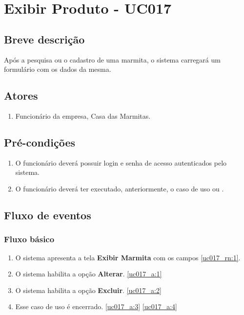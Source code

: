 \chapter{Exibir Produto - UC017} \label{uc017}

\section{Breve descrição}

Após a pesquisa ou o cadastro de uma marmita, o sistema carregará um formulário com os dados da mesma.

\section{Atores}

\begin{enumerate}
	\item Funcionário da empresa, Casa das Marmitas.
\end{enumerate}

\section{Pré-condições}

\begin{enumerate}
	\item O funcionário deverá possuir login e senha de acesso autenticados pelo sistema.
	\item O funcionário deverá ter executado, anteriormente, o caso de uso  ou .
\end{enumerate}

\section{Fluxo de eventos}

\subsection{Fluxo básico}

\begin{enumerate}[label=P\arabic*]
	\item O sistema apresenta a tela \textbf{Exibir Marmita} com os campos \ref{uc017_rn:1}. \label{uc017_p:1}
	\item O sistema habilita a opção \textbf{Alterar}. \label{uc017_p:2}\ref{uc017_a:1} 
	\item O sistema habilita a opção \textbf{Excluir}. \label{uc017_p:3}\ref{uc017_a:2}
	\item Esse caso de uso é encerrado. \label{uc017_p:4}\ref{uc017_a:3} \ref{uc017_a:4}
\end{enumerate}

